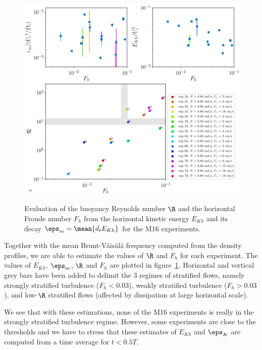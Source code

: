 \begin{figure}[htp!]
\includegraphics[width=\figwidth]{tmp/fig_R_vs_Fh}
\label{fig:RvsFh}

\caption{Evaluation of the buoyancy Reynolds number $\R$ and the horizontal
Froude number $F_h$ from the horizontal kinetic energy $E_{Kh}$ and its decay
$\eps_m = \mean{d_t E_{Kh}}$ for the M16 experiments.}

\end{figure}

Together with the mean Brunt-V\"ais\"al\"a frequency computed from the density
profiles, we are able to estimate the values of $\R$ and $F_h$ for each
experiment. The values of $E_{Kh}$, $\eps_m$, $\R$ and $F_h$ are plotted in
figure~\ref{fig:RvsFh}. Horizontal and vertical grey bars have been added to
delimit the 3 regimes of stratified flows, namely strongly stratified
turbulence ($F_h < 0.03$), weakly stratified turbulence ($F_h > 0.03$), and
low-$\R$ stratified flows (affected by dissipation at large horizontal scale).

We see that with these estimations, none of the M16 experiments is really in
the strongly stratified turbulence regime. However, some experiments are close to
the thresholds and we have to stress that these estimates of $E_{Kh}$ and
$\eps_K$ are computed from a time average for $t < 0.5 T$.

